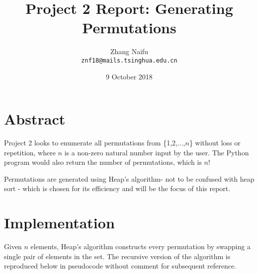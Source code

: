\documentclass{article}
\title{Project 2 Report: Generating Permutations} %
\author{Zhang Naifu\\ \texttt{znf18@mails.tsinghua.edu.cn}} %
\date{9 October 2018} %
\begin{document}
\maketitle %


\section*{Abstract} %

Project 2 looks to enumerate all permutations from \{1,2,...,\(n\)\} without loss or repetition, where \(n\) is a non-zero natural number input by the user. The Python program would also return the number of permutations, which is \(n!\)

Permutations are generated using Heap's algorithm\footnotemark - not to be confused with heap sort - which is chosen for its efficiency and will be the focus of this report. 




\section{Implementation} %

Given \(n\) elements, Heap's algorithm constructs every permutation by swapping a single pair of elements in the set. The recursive version of the algorithm is reproduced below in pseudocode without comment for subsequent reference.
\end{document}
